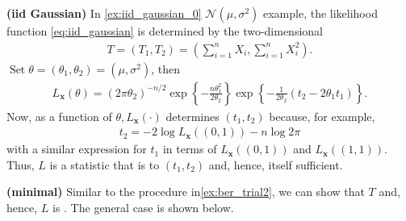 \documentclass{article}
\newcommand{\bfs}[1]{\textbf{({#1}) }}
\begin{document}
\begin{exma}\bfs{\gls{iid} Gaussian}
  In \cref{ex:iid_gaussian_0} $\mathcal{N}\left(\mu, \sigma^{2}\right)$ example, the likelihood function \cref{eq:iid_gaussian} is determined by the two-dimensional 
\begin{align*}
T=\left(T_{1}, T_{2}\right)=\left(\sum_{i=1}^{n} X_{i}, \sum_{i=1}^{n} X_{i}^{2}\right) .
\end{align*}
$\operatorname{Set} \theta=\left(\theta_{1}, \theta_{2}\right)=\left(\mu, \sigma^{2}\right)$, then
\begin{align*}
L_{\mathbf{x}}(\theta)=\left(2 \pi \theta_{2}\right)^{-n / 2} \exp \left\{-\frac{n \theta_{1}^{2}}{2 \theta_{2}}\right\} \exp \left\{-\frac{1}{2 \theta_{2}}\left(t_{2}-2 \theta_{1} t_{1}\right)\right\} .
\end{align*}
Now, as a function of $\theta, L_{\mathbf{x}}(\cdot)$ determines $\left(t_{1}, t_{2}\right)$ because, for example,
\begin{align*}
t_{2}=-2 \log L_{\mathbf{x}}((0,1))-n \log 2 \pi
\end{align*}
with a similar expression for $t_{1}$ in terms of $L_{\mathbf{x}}((0,1))$ and $L_{\mathbf{x}}((1,1))$. Thus, $L$ is a statistic that is  to $\left(t_{1}, t_{2}\right)$ and, hence, itself sufficient. 
\end{exma} 
\begin{rema}\bfs{minimal}
Similar to the procedure in\cref{ex:ber_trial2}, we can show that $T$ and, hence, $L$ is . The general case is shown below.
\end{rema}
\end{document}
